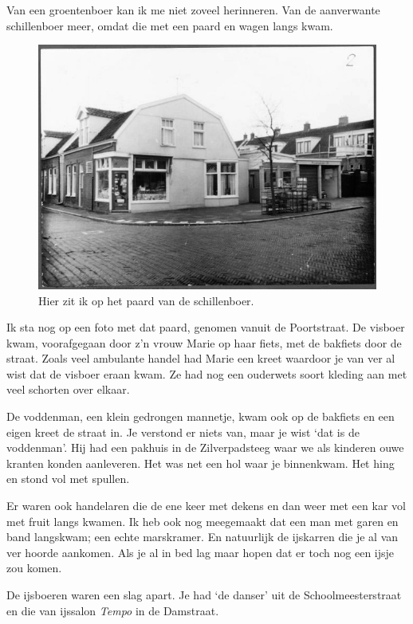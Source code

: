 \documentclass[10pt,twoside, openright]{memoir}
\begin{document}
Van een groentenboer kan ik me niet zoveel herinneren. Van de aanverwante schillenboer meer, omdat die met een paard en wagen langs kwam. 

\begin{figure}
\includegraphics[width=\textwidth]{img/64Rosmolenstraat-Langelaar-1966}
\caption*{\footnotesize Hier zit ik op het paard van de schillenboer.}
\end{figure}

Ik sta nog op een foto met dat paard, genomen vanuit de Poortstraat. De visboer kwam, voorafgegaan door z’n vrouw Marie op haar fiets, met de bakfiets door de straat. Zoals veel ambulante handel had Marie een kreet waardoor je van ver al wist dat de visboer eraan kwam. Ze had nog een ouderwets soort kleding aan met veel schorten over elkaar.

De voddenman, een klein gedrongen mannetje, kwam ook op de bakfiets en een eigen kreet de straat in. Je verstond er niets van, maar je wist `dat is de voddenman’. Hij had een pakhuis in de Zilverpadsteeg waar we als kinderen ouwe kranten konden aanleveren. Het was net een hol waar je binnenkwam. Het hing en stond vol met spullen. 

Er waren ook handelaren die de ene keer met dekens en dan weer met een kar vol met fruit langs kwamen. Ik heb ook nog meegemaakt dat een man met garen en band langskwam; een echte marskramer. En natuurlijk de ijskarren die je al van ver hoorde aankomen. Als je al in bed lag maar hopen dat er toch nog een ijsje zou komen.

De ijsboeren waren een slag apart. Je had `de danser’ uit de Schoolmeesterstraat en die van ijssalon \emph{Tempo} in de Damstraat. 
\end{document}
